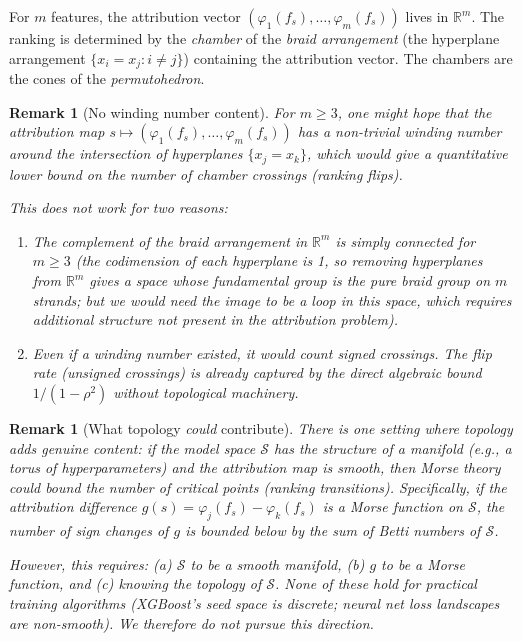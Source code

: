 \documentclass{article}
\newtheorem{remark}[theorem]{Remark}
\newcommand{\R}{\mathbb{R}}
\begin{document}
For $m$ features, the attribution vector $(\varphi_1(f_s), \ldots, \varphi_m(f_s))$ lives in $\R^m$. The ranking is determined by the \emph{chamber} of the \emph{braid arrangement} (the hyperplane arrangement $\{x_i = x_j : i \neq j\}$) containing the attribution vector. The chambers are the cones of the \emph{permutohedron}.

\begin{remark}[No winding number content]
For $m \geq 3$, one might hope that the attribution map
$s \mapsto (\varphi_1(f_s), \ldots, \varphi_m(f_s))$ has a
non-trivial winding number around the intersection of hyperplanes
$\{x_j = x_k\}$, which would give a \emph{quantitative} lower
bound on the number of chamber crossings (ranking flips).

This does not work for two reasons:
\begin{enumerate}
    \item The complement of the braid arrangement in
      $\mathbb{R}^m$ is simply connected for $m \geq 3$
      (the codimension of each hyperplane is 1, so removing
      hyperplanes from $\mathbb{R}^m$ gives a space whose
      fundamental group is the pure braid group on $m$ strands;
      but we would need the image to be a \emph{loop} in this
      space, which requires additional structure not present in
      the attribution problem).
    \item Even if a winding number existed, it would count
      \emph{signed} crossings. The flip rate (unsigned crossings)
      is already captured by the direct algebraic bound
      $1/(1-\rho^2)$ without topological machinery.
\end{enumerate}
\end{remark}

\begin{remark}[What topology \emph{could} contribute]
There is one setting where topology adds genuine content: if the
model space $\mathcal{S}$ has the structure of a manifold (e.g.,
a torus of hyperparameters) and the attribution map is smooth,
then Morse theory could bound the number of critical points
(ranking transitions). Specifically, if the attribution difference
$g(s) = \varphi_j(f_s) - \varphi_k(f_s)$ is a Morse function on
$\mathcal{S}$, the number of sign changes of $g$ is bounded below
by the sum of Betti numbers of $\mathcal{S}$.

However, this requires: (a) $\mathcal{S}$ to be a smooth manifold,
(b) $g$ to be a Morse function, and (c) knowing the topology of
$\mathcal{S}$. None of these hold for practical training algorithms
(XGBoost's seed space is discrete; neural net loss landscapes are
non-smooth). We therefore do not pursue this direction.
\end{remark}
\end{document}

